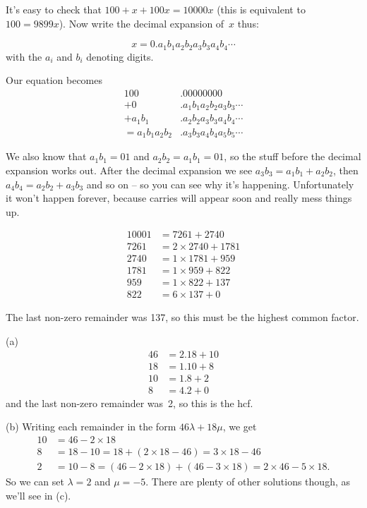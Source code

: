 \documentclass[10pt]{article}
\begin{document}
\medskip{} It's easy to check that $100+x+100x=10000x$ (this is equivalent to~$100=9899x$). Now write the decimal expansion of~$x$ thus:

$$x=0.a_1b_1a_2b_2a_3b_3a_4b_4\cdots$$
with the $a_i$ and $b_i$ denoting digits.

Our equation becomes
\begin{align*}
         100&.00000000\\
          +0&.a_1b_1a_2b_2a_3b_3\cdots\\
      +a_1b_1&.a_2b_2a_3b_3a_4b_4\cdots\\
=a_1b_1a_2b_2&.a_3b_3a_4b_4a_5b_5\cdots
\end{align*}

We also know that $a_1b_1=01$ and $a_2b_2=a_1b_1=01$, so the stuff before the decimal expansion works out. After the decimal expansion we see $a_3b_3=a_1b_1+a_2b_2$, then $a_4b_4=a_2b_2+a_3b_3$ and so on -- so you can see why it's happening. Unfortunately it won't happen forever, because carries will appear soon and really mess things up.

\medskip{}
\begin{align*}
10001&=7261+2740\\
7261&=2\times2740+1781\\
2740&=1\times 1781+959\\
1781&=1\times 959+822\\
959&=1\times 822+137\\
822&=6\times137+0
\end{align*}

The last non-zero remainder was 137, so this must be the highest common factor.

\medskip{} 

(a)
\begin{align*}
46&=2.18+10\\
18&=1.10+8\\
10&=1.8+2\\
8&=4.2+0
\end{align*}
and the last non-zero remainder was~2, so this is the hcf.

(b) Writing each remainder in the form $46\lambda+18\mu$, we get
\begin{align*}
10&=46-2\times 18\\
8&=18-10=18+(2\times18-46)=3\times18-46\\
2&=10-8=(46-2\times 18)+(46-3\times 18)=2\times46-5\times18.
\end{align*}
So we can set $\lambda=2$ and $\mu=-5$. There are plenty of other solutions though, as we'll see in (c).
\end{document}
